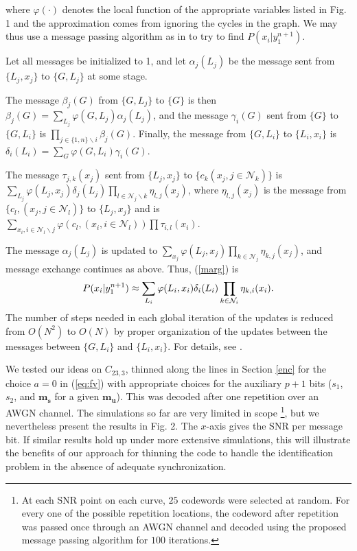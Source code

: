 \noindent where $\varphi(\cdot)$ denotes the local function of the
appropriate variables listed in Fig. 1 and the approximation comes
from ignoring the cycles in the graph. We may thus use a message
passing algorithm as in \cite{aji} to try to find
$P(x_i|y_1^{n+1})$.

Let all messages be initialized to 1, and let $\alpha_j(L_j)$ be
the message sent from $\{L_j,x_j\}$ to $\{G,L_j\}$ at some stage.

The message $\beta_j(G)$ from $\{G,L_j\}$ to $\{G\}$ is then
$\beta_j(G)=\sum_{L_j}\varphi (G,L_j)\alpha_j(L_j)$, and the
message $\gamma_i(G)$ sent from $\{G\}$ to $\{G,L_i\}$ is
$\prod_{j \in \{1,n\}\backslash i} \beta_j(G)$. Finally, the
message from $\{G,L_i\}$ to $\{L_i,x_i\}$ is
$\delta_i(L_i)=\sum_G\varphi(G,L_i)\gamma_i(G)$.

The message $\tau_{j,k}(x_j)$ sent from $\{L_j,x_j\}$ to $\{c_k
(x_j, j \in \mathcal{N}_k)\}$ is $\sum_{L_j}\varphi(L_j,x_j)
\delta_j(L_j)\prod_{l \in \mathcal{N}_j \backslash k}
\eta_{l,j}(x_j)$, where $\eta_{l,j}(x_j)$ is the message from
$\{c_l,(x_j, j\in \mathcal{N}_l)\}$ to $\{L_j,x_j\}$ and is
$\sum_{x_i,i\in \mathcal{N}_l\backslash j}\varphi(c_l, (x_i, i \in
\mathcal{N}_l)) \prod \tau_{i,l}(x_i).$

The message $\alpha_j(L_j)$ is updated to $\sum_{x_j}
\varphi(L_j,x_j) \prod_{k \in \mathcal{N}_j}\eta_{k,j}(x_j)$, and
message exchange continues as above. Thus, (\ref{marg}) is
\vspace{-0.00in}\begin{equation}P(x_i| y_1^{n+1}) \approx
\sum_{L_i}\varphi(L_i,x_i)\delta_i(L_i)\prod_{k \in \mathcal{N}_i}
\eta_{k,i} (x_i).\vspace{-0.02in}\end{equation}
\vspace{-0.02in}The number of steps needed in each global
iteration of the updates is reduced from $O(N^2)$ to $O(N)$ by
proper organization of the updates between the messages between
$\{G,L_i\}$ and $\{L_i, x_i\}$. For details, see
\cite{techArray:06}.


We tested our ideas on $C_{23,3}$, thinned along the lines in
Section \ref{enc} for the choice $a =0$ in (\ref{eq:fv}) with
appropriate choices for the auxiliary $p+1$ bits ($s_1$, $s_2$,
and ${\mathbf{m_s}}$ for a given ${\mathbf{m_u}}$). This was
decoded after one repetition over an AWGN channel. The simulations
so far are very limited in scope \footnote{At each SNR point on
each curve, $25$ codewords were selected at random. For every one
of the possible repetition locations, the codeword after
repetition was passed once through an AWGN channel and decoded
using the proposed message passing algorithm for $100$
iterations.}, but we nevertheless present the results in Fig. 2.
The $x$-axis gives the SNR per message bit. If similar results
hold up under more extensive simulations, this will illustrate the
benefits of our approach for thinning the code to handle the
identification problem in the absence of adequate synchronization.

